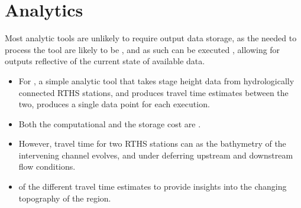 \documentclass[letterpaper,10pt,english]{sphinxmanual}
\begin{document}
\section{Analytics}
\label{\detokenize{requirements/information/analytics:analytics}}\label{\detokenize{requirements/information/analytics::doc}}
\sphinxAtStartPar
Most analytic tools are unlikely to require output data storage, as the  needed to process the tool are likely to be , and as such can be executed , allowing for outputs reflective of the current state of available data.
\begin{itemize}
\item {} 
\sphinxAtStartPar
For , a simple analytic tool that takes stage height data from hydrologically connected RTHS stations, and produces travel time estimates between the two, produces a single data point for each execution.

\item {} 
\sphinxAtStartPar
Both the computational  and the storage cost are .

\item {} 
\sphinxAtStartPar
However, travel time  for two RTHS stations can  as the bathymetry of the intervening channel evolves, and under deferring upstream and downstream flow conditions.

\item {} 
\sphinxAtStartPar
{} of the different travel time estimates  to provide insights into the changing topography of the region.

\end{itemize}
\end{document}
